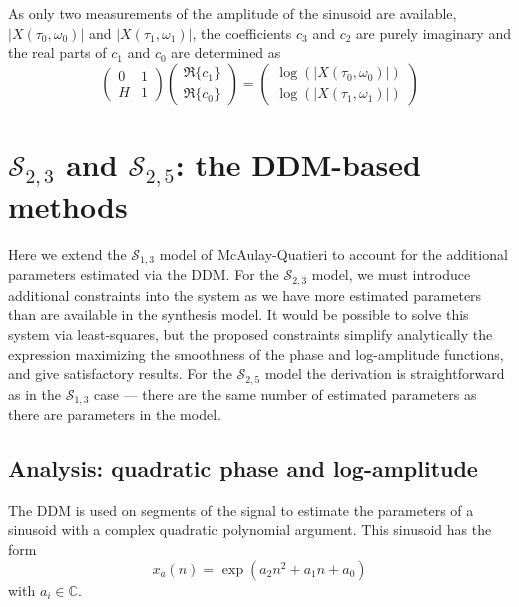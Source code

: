 As only two measurements of the amplitude of the sinusoid are available,
$|X(\tau_0,\omega_0)|$ and $|X(\tau_1,\omega_1)|$, the coefficients
$c_3$ and $c_2$ are purely imaginary and the real parts of $c_1$ and $c_0$ are
determined as
\[
    \begin{pmatrix}
        0 & 1 \\
        H & 1
    \end{pmatrix}
    \begin{pmatrix}
        \Re\{c_1\} \\
        \Re\{c_0\}
    \end{pmatrix}
    =
    \begin{pmatrix}
        \log(|X(\tau_0,\omega_0)|) \\
        \log(|X(\tau_1,\omega_1)|)
    \end{pmatrix}
\]

\section{$\mathscr{S}_{2,3}$ and $\mathscr{S}_{2,5}$: the DDM-based methods}

Here we extend the $\mathscr{S}_{1,3}$ model of McAulay-Quatieri to account for
the additional parameters estimated via the DDM. For the $\mathscr{S}_{2,3}$
model, we must introduce additional constraints into the system as we have more
estimated parameters than are available in the synthesis model. It would be
possible to solve this system via least-squares, but the proposed constraints
simplify analytically the expression maximizing the smoothness of the phase and
log-amplitude
functions, and give satisfactory results. For the $\mathscr{S}_{2,5}$ model the
derivation is straightforward as in the $\mathscr{S}_{1,3}$ case --- there are
the same number of estimated parameters as there are parameters in the model.

\subsection{Analysis: quadratic phase and log-amplitude \label{sec:s235analysis}}

The DDM is used on segments of the signal to estimate the parameters of a sinusoid
with a complex quadratic polynomial argument. This sinusoid has the form
\begin{equation}
    \label{eq:quadraticphasepoly}
    x_{a}(n) = \exp \left(a_2 n^{2} + a_1 n + a_0 \right)
\end{equation}
with $a_{i} \in \mathbb{C}$.

